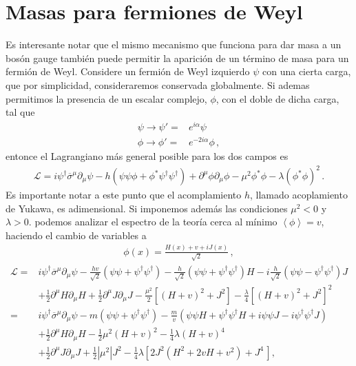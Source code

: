 \section{Masas para fermiones de Weyl}
Es interesante notar que el mismo mecanismo que funciona para dar masa a un bosón gauge también puede permitir la aparición de un término de masa para un fermión de Weyl. Considere un fermión de Weyl izquierdo $\psi$ con una cierta carga, que por simplicidad, consideraremos conservada globalmente. Si ademas permitimos la presencia de un escalar complejo, $\phi$, con el doble de dicha carga, tal que
\begin{align}
  \psi\to \psi'=&e^{i\alpha}\psi \nonumber\\
  \phi\to \phi'=&e^{-2i\alpha}\phi\,,
\end{align}
entonce el Lagrangiano más general posible para los dos campos es
\begin{align}
  \mathcal{L}=i\psi^{\dagger}\overline{\sigma}^{\mu}\partial_{\mu}\psi-h \left( \psi\psi\phi+\phi^{*}\psi^{\dagger}\psi^{\dagger} \right)
+\partial^{\mu}\phi\partial_{\mu}\phi-\mu^2 \phi^{*}\phi-\lambda \left( \phi^{*}\phi \right)^{2}\,.
\end{align}
Es importante notar a este punto que el acomplamiento $h$, llamado acoplamiento de Yukawa, es adimensional. Si imponemos además las condiciones $\mu^2<0$ y $\lambda>0$. podemos analizar el espectro de la teoría cerca al mínimo $\left\langle \phi \right\rangle=v$, haciendo el cambio de variables a
\begin{align}
  \phi(x)=\frac{H(x)+v+i J(x)}{\sqrt{2}}\,,
\end{align}
\begin{align*}
   \mathcal{L}=&i\psi^{\dagger}\overline{\sigma}^{\mu}\partial_{\mu}\psi-\frac{h v}{\sqrt{2}} \left( \psi\psi +\psi^{\dagger}\psi^{\dagger} \right)
-\frac{h }{\sqrt{2}} \left( \psi\psi +\psi^{\dagger}\psi^{\dagger} \right)H-i\frac{h }{\sqrt{2}} \left( \psi\psi -\psi^{\dagger}\psi^{\dagger} \right)J \nonumber\\
&+\frac{1}{2}\partial^{\mu} H\partial_{\mu} H+\frac{1}{2}\partial^{\mu} J\partial_{\mu} J-\frac{\mu^2}{2} \left[(H+v)^2+J^2\right]-\frac{\lambda}{4} \left[(H+v)^2+J^2\right]^2 \nonumber\\
               =&i\psi^{\dagger}\overline{\sigma}^{\mu}\partial_{\mu}\psi-m \left( \psi\psi +\psi^{\dagger}\psi^{\dagger} \right)-\frac{m}{v} \left( \psi\psi H  +\psi^{\dagger}\psi^{\dagger}H +i\psi\psi J -i\psi^{\dagger}\psi^{\dagger}J \right) \nonumber\\
&+\tfrac{1}{2}\partial^{\mu} H\partial_{\mu} H-\tfrac{1}{2}\mu^2(H+v)^2-\tfrac{1}{4}\lambda (H+v)^4  \nonumber\\
&+\tfrac{1}{2}\partial^{\mu} J\partial_{\mu} J+\frac{1}{2}\left| \mu^2 \right| J^2-\tfrac{1}{4}\lambda \left[2J^2 \left( H^2+2vH+v^2 \right)+J^4\,\right],
\end{align*}
